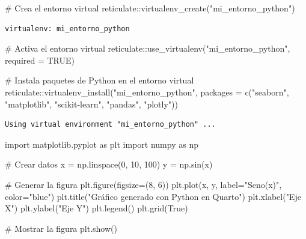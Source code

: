 \documentclass[
  10pt,
]{article}
\newenvironment{Shaded}{\begin{snugshade}}{\end{snugshade}}
\newcommand{\AttributeTok}[1]{\textcolor[rgb]{0.40,0.45,0.13}{#1}}
\newcommand{\CommentTok}[1]{\textcolor[rgb]{0.37,0.37,0.37}{#1}}
\newcommand{\ConstantTok}[1]{\textcolor[rgb]{0.56,0.35,0.01}{#1}}
\newcommand{\DecValTok}[1]{\textcolor[rgb]{0.68,0.00,0.00}{#1}}
\newcommand{\FunctionTok}[1]{\textcolor[rgb]{0.28,0.35,0.67}{#1}}
\newcommand{\ImportTok}[1]{\textcolor[rgb]{0.00,0.46,0.62}{#1}}
\newcommand{\NormalTok}[1]{\textcolor[rgb]{0.00,0.23,0.31}{#1}}
\newcommand{\OperatorTok}[1]{\textcolor[rgb]{0.37,0.37,0.37}{#1}}
\newcommand{\SpecialCharTok}[1]{\textcolor[rgb]{0.37,0.37,0.37}{#1}}
\newcommand{\StringTok}[1]{\textcolor[rgb]{0.13,0.47,0.30}{#1}}
\newcommand{\VariableTok}[1]{\textcolor[rgb]{0.07,0.07,0.07}{#1}}
\begin{document}
\begin{Shaded}
\begin{Highlighting}[]
\CommentTok{\# Crea el entorno virtual}
\NormalTok{reticulate}\SpecialCharTok{::}\FunctionTok{virtualenv\_create}\NormalTok{(}\StringTok{"mi\_entorno\_python"}\NormalTok{)}
\end{Highlighting}
\end{Shaded}

\begin{verbatim}
virtualenv: mi_entorno_python
\end{verbatim}

\begin{Shaded}
\begin{Highlighting}[]
\CommentTok{\# Activa el entorno virtual}
\NormalTok{reticulate}\SpecialCharTok{::}\FunctionTok{use\_virtualenv}\NormalTok{(}\StringTok{"mi\_entorno\_python"}\NormalTok{, }\AttributeTok{required =} \ConstantTok{TRUE}\NormalTok{)}

\CommentTok{\# Instala paquetes de Python en el entorno virtual}
\NormalTok{reticulate}\SpecialCharTok{::}\FunctionTok{virtualenv\_install}\NormalTok{(}\StringTok{"mi\_entorno\_python"}\NormalTok{, }
                   \AttributeTok{packages =} \FunctionTok{c}\NormalTok{(}\StringTok{"seaborn"}\NormalTok{, }\StringTok{"matplotlib"}\NormalTok{, }
                                \StringTok{"scikit{-}learn"}\NormalTok{, }\StringTok{"pandas"}\NormalTok{, }\StringTok{"plotly"}\NormalTok{))}
\end{Highlighting}
\end{Shaded}

\begin{verbatim}
Using virtual environment "mi_entorno_python" ...
\end{verbatim}

\begin{Shaded}
\begin{Highlighting}[]
\ImportTok{import}\NormalTok{ matplotlib.pyplot }\ImportTok{as}\NormalTok{ plt}
\ImportTok{import}\NormalTok{ numpy }\ImportTok{as}\NormalTok{ np}

\CommentTok{\# Crear datos}
\NormalTok{x }\OperatorTok{=}\NormalTok{ np.linspace(}\DecValTok{0}\NormalTok{, }\DecValTok{10}\NormalTok{, }\DecValTok{100}\NormalTok{)}
\NormalTok{y }\OperatorTok{=}\NormalTok{ np.sin(x)}

\CommentTok{\# Generar la figura}
\NormalTok{plt.figure(figsize}\OperatorTok{=}\NormalTok{(}\DecValTok{8}\NormalTok{, }\DecValTok{6}\NormalTok{))}
\NormalTok{plt.plot(x, y, label}\OperatorTok{=}\StringTok{"Seno(x)"}\NormalTok{, color}\OperatorTok{=}\StringTok{"blue"}\NormalTok{)}
\NormalTok{plt.title(}\StringTok{"Gráfico generado con Python en Quarto"}\NormalTok{)}
\NormalTok{plt.xlabel(}\StringTok{"Eje X"}\NormalTok{)}
\NormalTok{plt.ylabel(}\StringTok{"Eje Y"}\NormalTok{)}
\NormalTok{plt.legend()}
\NormalTok{plt.grid(}\VariableTok{True}\NormalTok{)}

\CommentTok{\# Mostrar la figura}
\NormalTok{plt.show()}
\end{Highlighting}
\end{Shaded}
\end{document}
